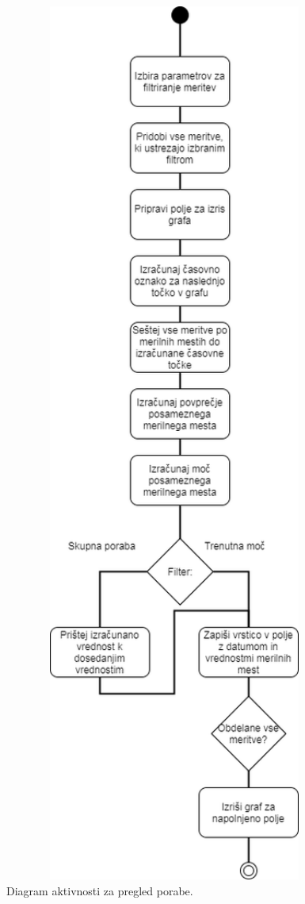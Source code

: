 \documentclass[12pt,a4paper,titlepage,openany]{report}
\begin{document}
\begin{figure}[H]
\begin{center}
\includegraphics[width=1\textwidth, height=0.9\textheight,keepaspectratio]{Slike/ActivityPoraba.png}
\end{center}
\caption{Diagram aktivnosti za pregled porabe.}\label{slika:ActivityPoraba}
\end{figure}
\end{document}
